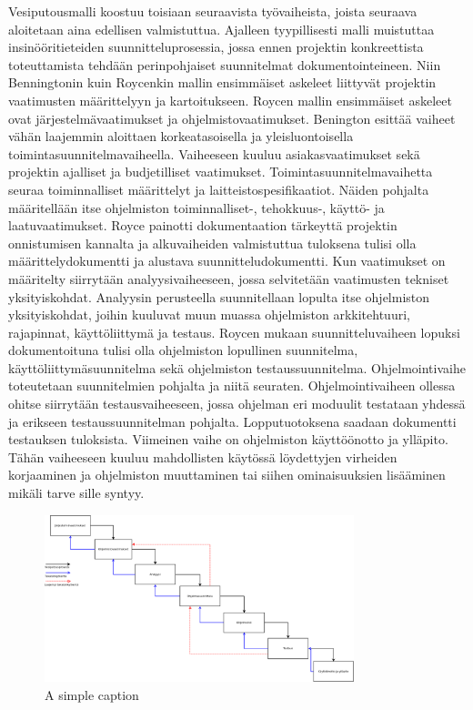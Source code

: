 \documentclass[finnish,12pt]{tktltiki2}
\theoremstyle{definition}
\theoremstyle{remark}
\begin{document}
Vesiputousmalli koostuu toisiaan seuraavista työvaiheista, joista seuraava aloitetaan aina edellisen valmistuttua. Ajalleen tyypillisesti malli muistuttaa insinööritieteiden suunnitteluprosessia, jossa ennen projektin konkreettista toteuttamista tehdään perinpohjaiset suunnitelmat dokumentointeineen. Niin Benningtonin kuin Roycenkin mallin ensimmäiset askeleet liittyvät projektin vaatimusten määrittelyyn ja kartoitukseen. Roycen mallin ensimmäiset askeleet ovat järjestelmävaatimukset ja ohjelmistovaatimukset\cite{Royce1970}. Benington esittää vaiheet vähän laajemmin aloittaen korkeatasoisella ja yleisluontoisella toimintasuunnitelmavaiheella. Vaiheeseen kuuluu asiakasvaatimukset sekä projektin ajalliset ja budjetilliset vaatimukset. Toimintasuunnitelmavaihetta seuraa toiminnalliset määrittelyt ja laitteistospesifikaatiot. \cite{Benington:1987:PLC:41765.41799} Näiden pohjalta määritellään itse ohjelmiston toiminnalliset-, tehokkuus-, käyttö- ja laatuvaatimukset. Royce painotti dokumentaation tärkeyttä projektin onnistumisen kannalta ja alkuvaiheiden valmistuttua tuloksena tulisi olla määrittelydokumentti ja alustava suunnitteludokumentti. Kun vaatimukset on määritelty siirrytään analyysivaiheeseen, jossa selvitetään vaatimusten tekniset yksityiskohdat. Analyysin perusteella suunnitellaan lopulta itse ohjelmiston yksityiskohdat, joihin kuuluvat muun muassa ohjelmiston arkkitehtuuri, rajapinnat, käyttöliittymä ja testaus. Roycen mukaan suunnitteluvaiheen lopuksi dokumentoituna tulisi olla ohjelmiston lopullinen suunnitelma, käyttöliittymäsuunnitelma sekä ohjelmiston testaussuunnitelma. Ohjelmointivaihe toteutetaan suunnitelmien pohjalta ja niitä seuraten. Ohjelmointivaiheen ollessa ohitse siirrytään testausvaiheeseen, jossa ohjelman eri moduulit testataan yhdessä ja erikseen testaussuunnitelman pohjalta. Lopputuotoksena saadaan dokumentti testauksen tuloksista. Viimeinen vaihe on ohjelmiston käyttöönotto ja ylläpito. Tähän vaiheeseen kuuluu mahdollisten käytössä löydettyjen virheiden korjaaminen ja ohjelmiston muuttaminen tai siihen ominaisuuksien lisääminen mikäli tarve sille syntyy.

\begin{figure}[ht!]
\centering
\includegraphics[width=90mm]{Diagram1.png}
\caption{A simple caption}
\label{overflow}
\end{figure}
\end{document}
